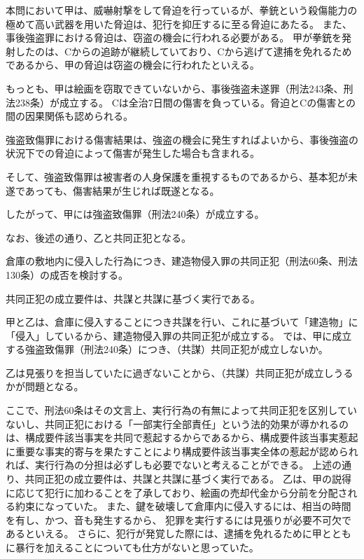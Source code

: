 \documentclass[11pt]{jsarticle}
\begin{document}
				本問において甲は、威嚇射撃をして脅迫を行っているが、拳銃という殺傷能力の極めて高い武器を用いた脅迫は、犯行を抑圧するに至る脅迫にあたる。
			\sectionC{}
				また、事後強盗罪における脅迫は、窃盗の機会に行われる必要がある。
				甲が拳銃を発射したのは、Cからの追跡が継続していており、Cから逃げて逮捕を免れるためであるから、甲の脅迫は窃盗の機会に行われたといえる。
				
				もっとも、甲は絵画を窃取できていないから、事後強盗未遂罪（刑法243条、刑法238条）が成立する。
	\sectionB{}
		Cは全治7日間の傷害を負っている。脅迫とCの傷害との間の因果関係も認められる。
		
		強盗致傷罪における傷害結果は、強盗の機会に発生すればよいから、事後強盗の状況下での脅迫によって傷害が発生した場合も含まれる。
		
		そして、強盗致傷罪は被害者の人身保護を重視するものであるから、基本犯が未遂であっても、傷害結果が生じれば既遂となる。
		
		したがって、甲には強盗致傷罪（刑法240条）が成立する。
		
		なお、後述の通り、乙と共同正犯となる。
		
	\sectionB{}
		倉庫の敷地内に侵入した行為につき、建造物侵入罪の共同正犯（刑法60条、刑法130条）の成否を検討する。
		
		共同正犯の成立要件は、共謀と共謀に基づく実行である。
		
		甲と乙は、倉庫に侵入することにつき共謀を行い、これに基づいて「建造物」に「侵入」しているから、建造物侵入罪の共同正犯が成立する。
	\sectionB{}
		では、甲に成立する強盗致傷罪（刑法240条）につき、（共謀）共同正犯が成立しないか。
		
		\sectionC{}
			乙は見張りを担当していたに過ぎないことから、（共謀）共同正犯が成立しうるかが問題となる。
		
			ここで、刑法60条はその文言上、実行行為の有無によって共同正犯を区別していないし、共同正犯における「一部実行全部責任」という法的効果が導かれるのは、構成要件該当事実を共同で惹起するからであるから、構成要件該当事実惹起に重要な事実的寄与を果たすことにより構成要件該当事実全体の惹起が認められれば、実行行為の分担は必ずしも必要でないと考えることができる。
		\sectionC{}
			上述の通り、共同正犯の成立要件は、共謀と共謀に基づく実行である。
			\sectionD{}
				乙は、甲の説得に応じて犯行に加わることを了承しており、絵画の売却代金から分前を分配される約束になっていた。
				また、鍵を破壊して倉庫内に侵入するには、相当の時間を有し、かつ、音も発生するから、
				犯罪を実行するには見張りが必要不可欠であるといえる。
				さらに、犯行が発覚した際には、逮捕を免れるために甲とともに暴行を加えることについても仕方がないと思っていた。
		
\end{document}
